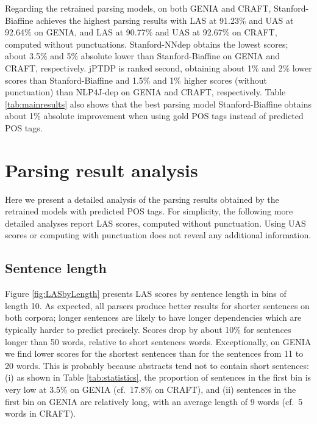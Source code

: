 \documentclass[twocolumn,hyperref]{bmcart}\pdfoutput=1
\newcommand{\CHANGEA}[1]{#1}
\begin{document}
Regarding the retrained  parsing models, on both GENIA and CRAFT,   Stanford-Biaffine  achieves the highest parsing results with LAS at 91.23\% and UAS at 92.64\%  on GENIA, and LAS at 90.77\% and UAS at 92.67\% on CRAFT, computed without punctuations.  
Stanford-NNdep  obtains the lowest  scores; about 3.5\% and 5\% absolute lower  than Stanford-Biaffine on GENIA and CRAFT, respectively.  jPTDP is ranked second, obtaining about   1\% and 2\% lower scores than Stanford-Biaffine  and 1.5\% and 1\% higher scores  (without punctuation) than   NLP4J-dep on GENIA and CRAFT, respectively.   \CHANGEA{Table \ref{tab:mainresults} also shows that the best  parsing model  Stanford-Biaffine obtains    about 1\% absolute improvement when using gold POS tags instead of predicted POS tags. }



\section*{Parsing result analysis}\label{sssec:accuracyana}
Here we present a detailed  analysis of the parsing results obtained by the retrained  models  \CHANGEA{with predicted POS tags.} 
For simplicity,  the following more detailed analyses report LAS scores, computed  without punctuation. Using UAS  scores or computing with punctuation does not reveal any additional information.




\subsection*{Sentence length}

Figure \ref{fig:LASbyLength} presents LAS scores by sentence length in bins of length 10.  As expected, all parsers produce better results for shorter sentences on both corpora; longer sentences are likely to have longer dependencies which are typically harder to predict precisely. 
 Scores drop by about 10\% for sentences longer than 50 words, relative to short sentences  words.  Exceptionally, on GENIA we find lower scores for the shortest sentences than for the  
sentences from 11 to 20 words. This is probably because abstracts tend not to contain short sentences: (i) as shown in Table \ref{tab:statistics},  
the proportion of sentences in the first bin is very low at 3.5\% on GENIA (cf.\ 17.8\% on CRAFT), and (ii)   sentences in the  first  bin on GENIA are relatively long, with an average length of 9 words (cf.\ 5 words in CRAFT).
\end{document}

